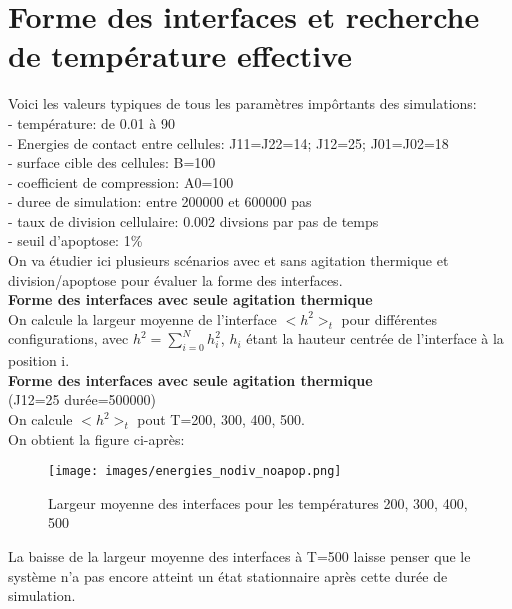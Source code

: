 \documentclass[11pt,a4paper]{article}
\begin{document}
\section{Forme des interfaces et recherche de température effective}

Voici les valeurs typiques de tous les paramètres impôrtants des simulations:\\
- température: de 0.01 à 90\\
- Energies de contact entre cellules: J11=J22=14; J12=25; J01=J02=18\\
- surface cible des cellules: B=100\\
- coefficient de compression: A0=100\\
- duree de simulation: entre 200000 et 600000 pas\\
- taux de division cellulaire: 0.002 divsions par pas de temps\\
- seuil d'apoptose: 1\%\\

On va étudier ici plusieurs scénarios avec et sans agitation thermique et division/apoptose pour évaluer la forme des interfaces.\\

\textbf{Forme des interfaces avec seule agitation thermique}\\

On calcule la largeur moyenne de l'interface $<h^2>_t$ pour différentes configurations, avec $h^2=\sum_{i=0}^N h_i^2 $, $h_i$ étant la hauteur centrée de l'interface à la position i. \\

\textbf{Forme des interfaces avec seule agitation thermique}\\
(J12=25 durée=500000)\\

On calcule $<h^2>_t$ pout T=200, 300, 400, 500.\\

On obtient la figure ci-après:

\begin{figure}[H]
\begin{center}
\texttt{[image: images/energies\_nodiv\_noapop.png]}
\caption{Largeur moyenne des interfaces pour les températures 200, 300, 400, 500}
\label{mafigure}
\end{center}
\end{figure}

La baisse de la largeur moyenne des interfaces à T=500 laisse penser que le système n'a pas encore atteint un état stationnaire après cette durée de simulation.\\
\end{document}
